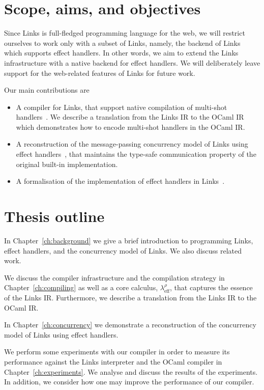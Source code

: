 \documentclass[12pt,mscres,cdtppar,twoside,openright,logo,rightchapter,normalheadings]{infthesis}
\theoremstyle{definition}
\newcommand{\Calc}{\ensuremath{\lambda_{\text{eff}}^\rho}\xspace}
\begin{document}
\section{Scope, aims, and objectives}

Since Links is full-fledged programming language for the web, we will
restrict ourselves to work only with a subset of Links, namely, the
backend of Links which supports effect handlers. In other words, we
aim to extend the Links infrastructure with a native backend for
effect handlers. We will deliberately leave support for the
web-related features of Links for future work.

Our main contributions are
\begin{itemize}
\item A compiler for Links, that support native compilation of
  multi-shot handlers~\citep{Hillerstrom2016b}. We describe a
  translation from the Links IR to the OCaml IR which demonstrates how
  to encode multi-shot handlers in the OCaml IR.
\item A reconstruction of the message-passing concurrency model of
  Links using effect handlers~\citep{Hillerstrom2016c}, that maintains
  the type-safe communication property of the original built-in
  implementation.
\item A formalisation of the implementation of effect handlers in
  Links~\citep{Hillerstrom2016a}.
\end{itemize}

\section{Thesis outline}

In Chapter~\ref{ch:background} we give a brief introduction to
programming Links, effect handlers, and the concurrency model of
Links. We also discuss related work.

We discuss the compiler infrastructure and the compilation strategy in
Chapter~\ref{ch:compiling} as well as a core calculus, \Calc{}, that
captures the essence of the Links IR. Furthermore, we describe a
translation from the Links IR to the OCaml IR.

In Chapter~\ref{ch:concurrency} we demonstrate a reconstruction of the
concurrency model of Links using effect handlers.

We perform some experiments with our compiler in order to measure its
performance against the Links interpreter and the OCaml compiler in
Chapter~\ref{ch:experiments}. We analyse and discuss the results of
the experiments. In addition, we consider how one may improve the
performance of our compiler.
\end{document}
